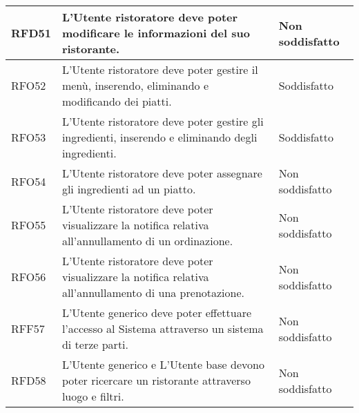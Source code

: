 \begin{longtable}{|l|p{}|p{3cm}|}
	\hline
	RFD51       & L'Utente ristoratore deve poter modificare le informazioni del suo ristorante.                                          & Non soddisfatto \\
	\hline
	RFO52       & L'Utente ristoratore deve poter gestire il menù, inserendo, eliminando e modificando dei piatti.                        & Soddisfatto \\
	\hline
	RFO53       & L'Utente ristoratore deve poter gestire gli ingredienti, inserendo e eliminando degli ingredienti.                      & Soddisfatto \\
	\hline
	RFO54       & L'Utente ristoratore deve poter assegnare gli ingredienti ad un piatto.                                                 & Non soddisfatto \\
	\hline
	RFO55       & L'Utente ristoratore deve poter visualizzare la notifica relativa all'annullamento di un ordinazione.                   & Non soddisfatto \\
	\hline
	RFO56       & L'Utente ristoratore deve poter visualizzare la notifica relativa all'annullamento di una prenotazione.                 & Non soddisfatto \\
	\hline
	RFF57       & L'Utente generico deve poter effettuare l'accesso al Sistema attraverso un sistema di terze parti.                 	& Non soddisfatto \\
	\hline
	RFD58	   & L'Utente generico e L'Utente base devono poter ricercare un ristorante attraverso luogo e filtri.  					& Non soddisfatto \\
	\hline
\end{longtable}
